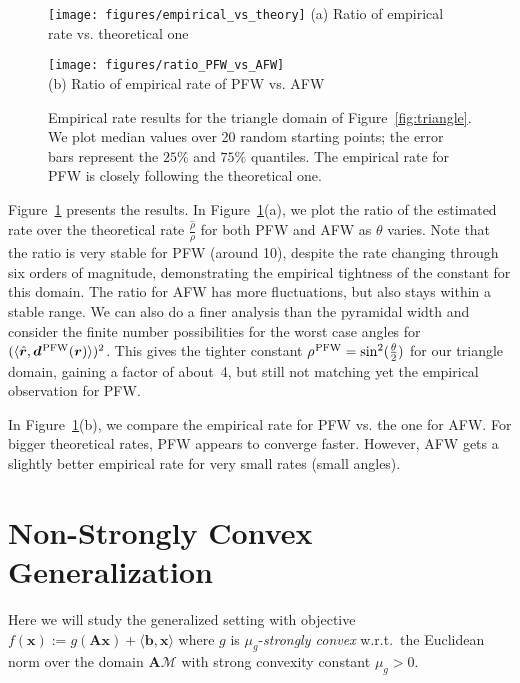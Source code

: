 \documentclass{article} %
\newcommand{\domain}{\mathcal{M}} %
\newcommand{\PFW}{{\hspace{0.05em}\textnormal{PFW}}}
\newcommand{\x}{\bm{x}}
\newcommand{\dd}{\bm{d}}
\renewcommand{\r}{\bm{r}}
\newcommand{\innerProdCompressed}[2]{\langle #1 , #2 \rangle}
\newcommand{\A}{\bm{A}}
\newcommand{\bv}{\bm{b}}
\newcommand{\0}{\mathbf{0}} %
\begin{document}
\begin{figure}[t]
\begin{center}
%
\begin{minipage}{0.46\linewidth}
\centering
\texttt{[image: figures/empirical\_vs\_theory]}
(a)  Ratio of empirical rate vs. theoretical one
\end{minipage}	
\hfill
\begin{minipage}{0.48\linewidth}
\centering
\texttt{[image: figures/ratio\_PFW\_vs\_AFW]}
\\[3mm]
(b) Ratio of empirical rate of PFW vs. AFW
\end{minipage}
\end{center}
\caption{Empirical rate results for the triangle domain of Figure~\ref{fig:triangle}.
We plot median values over 20 random starting points; the
error bars represent the $25\%$ and $75\%$ quantiles.
The empirical rate for PFW is closely following the theoretical one.} \label{fig:triangleResults}
\end{figure}


Figure~\ref{fig:triangleResults} presents the results.
In Figure~\ref{fig:triangleResults}(a), we
plot the ratio of the estimated rate over
the theoretical rate $\frac{\hat{\rho}}{\rho}$ for both PFW 
and AFW as $\theta$ varies. Note that the ratio
is very stable for PFW (around 10), despite the rate
changing through six orders of magnitude, demonstrating
the empirical tightness of the constant for this domain. 
The ratio for AFW has more fluctuations, but also stays
within a stable range. We can also 
do a finer analysis than the pyramidal width and
consider the finite number possibilities for the worst case angles
 for $(\innerProdCompressed{\hat{\r}}{{\dd^\PFW(\r)}})^2$.
This gives the tighter constant $\rho^\PFW = \sin^2(\frac{\theta}{2})$
for our triangle domain, gaining a factor of about~4, but still
not matching yet the empirical observation for PFW.

In Figure~\ref{fig:triangleResults}(b), we compare the empirical
rate for PFW vs. the one for AFW. For bigger theoretical rates, PFW appears
to converge faster. However, AFW gets a slightly
better empirical rate for very small rates (small angles).


%
\section{Non-Strongly Convex Generalization} \label{app:NonStronglyConvex}

Here we will study the generalized setting with objective $f(\x) := g(\A \x) + \innerProdCompressed{\bv}{\x}$ where $g$ is $\mu_g$-\emph{strongly convex} w.r.t.\ the Euclidean norm over the domain $\A \domain$ with strong convexity constant $\mu_g > 0$. 
\end{document}
